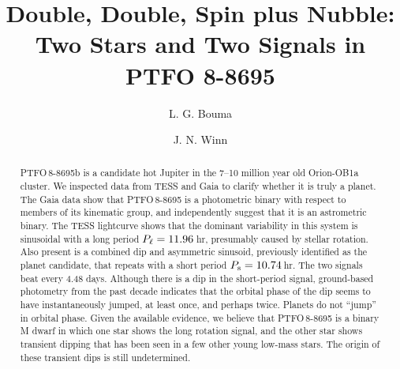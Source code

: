 \documentclass[12pt,twocolumn,tighten]{aastex62}
\begin{document}

\title{Double, Double, Spin plus Nubble: Two Stars and Two Signals in
PTFO 8-8695}



%
%
\author[0000-0002-0514-5538]{L. G. Bouma}
%
\author[0000-0002-4265-047X]{J. N. Winn}

\begin{abstract}
  PTFO$\,$8-8695b is a candidate hot Jupiter in the 7--10 million year
  old Orion-OB1a cluster. We inspected data from TESS and Gaia to
  clarify whether it is truly a planet.  The Gaia data show that
  PTFO$\,$8-8695 is a photometric binary with respect to members of
  its kinematic group, and independently suggest that it is an
  astrometric binary.  The TESS lightcurve shows that the dominant
  variability in this system is sinusoidal with a long period $P_{\rm
  \ell}=11.96\,$hr, presumably caused by stellar rotation.  Also
  present is a combined dip and asymmetric sinusoid, previously
  identified as the planet candidate, that repeats with a short period
  $P_{\rm s}= 10.74\,$hr.  The two signals beat every 4.48 days.
  Although there is a dip in the short-period signal, ground-based
  photometry from the past decade indicates that the orbital phase of
  the dip seems to have instantaneously jumped, at least once, and
  perhaps twice.  Planets do not ``jump'' in orbital phase.  Given the
  available evidence, we believe that PTFO$\,$8-8695 is a binary M
  dwarf in which one star shows the long rotation signal, and the
  other star shows transient dipping that has been seen in a few other
  young low-mass stars.  The origin of these transient dips is still
  undetermined.
\end{abstract}

\end{document}

